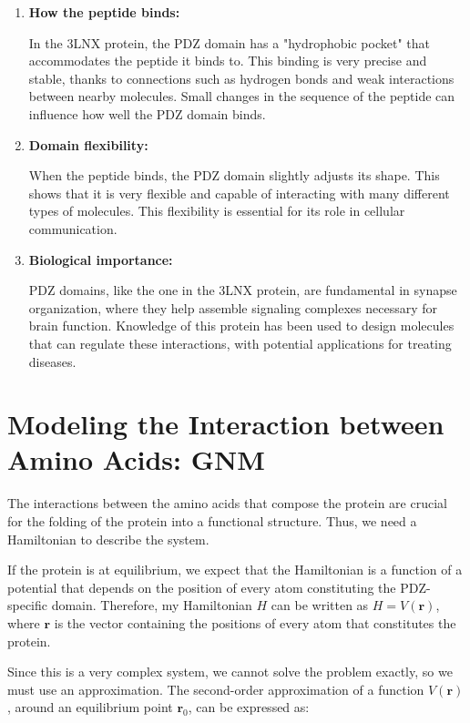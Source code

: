 \documentclass[English, Lau, oneside]{sapthesis}
\begin{document}
\begin{enumerate}
    \item \textbf{How the peptide binds:}
    
    In the 3LNX protein, the PDZ domain has a "hydrophobic pocket" that accommodates the peptide it binds to. This binding is very precise and stable, thanks to connections such as hydrogen bonds and weak interactions between nearby molecules. Small changes in the sequence of the peptide can influence how well the PDZ domain binds.

    \item \textbf{Domain flexibility:}
    
    When the peptide binds, the PDZ domain slightly adjusts its shape. This shows that it is very flexible and capable of interacting with many different types of molecules. This flexibility is essential for its role in cellular communication.

    \item \textbf{Biological importance:}
    
    PDZ domains, like the one in the 3LNX protein, are fundamental in synapse organization, where they help assemble signaling complexes necessary for brain function. Knowledge of this protein has been used to design molecules that can regulate these interactions, with potential applications for treating diseases.
\end{enumerate}







\chapter{Modeling the Interaction between Amino Acids: GNM}
\noindent The interactions between the amino acids that compose the protein are crucial for the folding of the protein into a functional structure.  
Thus, we need a Hamiltonian to describe the system. 

If the protein is at equilibrium, we expect that the Hamiltonian is a function of a potential that depends on the position of every atom constituting the PDZ-specific domain.  
Therefore, my Hamiltonian \( H \) can be written as \( H = V(\mathbf{r}) \), where \( \mathbf{r} \) is the vector containing the positions of every atom that constitutes the protein.  

Since this is a very complex system, we cannot solve the problem exactly, so we must use an approximation. The second-order approximation of a function \( V(\mathbf{r}) \), around an equilibrium point \( \mathbf{r}_0 \), can be expressed as:\cite{ref9}
\end{document}
